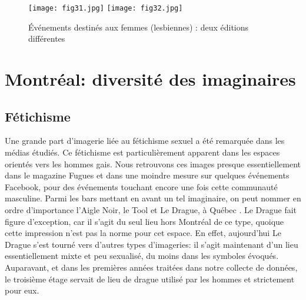 \begin{figure}
\centering
{}
{\texttt{[image: fig31.jpg]}}
{\texttt{[image: fig32.jpg]}}
\caption{Événements destinés aux femmes (lesbiennes) : deux éditions
  différentes}\label{figs3132}
\end{figure}

\section{Montréal: diversité des imaginaires}
\label{sec:montr_al_diversit_des_imaginaires}

\subsection{Fétichisme}
Une grande part d'imagerie liée au fétichisme sexuel a été remarquée dans les médias étudiés. 
Ce fétichisme est particulièrement apparent dans les espaces orientés vers les hommes gais. 
Nous retrouvons ces images presque essentiellement dans le magazine Fugues et dans une moindre mesure sur quelques événements Facebook, pour des événements touchant encore une fois cette communauté masculine. 
Parmi les bars mettant en avant un tel imaginaire, on peut nommer en ordre d'importance l'Aigle Noir, le Tool et Le Drague, à Québec . 
Le Drague fait figure d'exception, car il s'agit du seul lieu hors Montréal de ce type, quoique cette impression n'est pas la norme pour cet espace. 
En effet, aujourd'hui Le Drague s'est tourné vers d'autres types d'imageries: il s'agit maintenant d'un lieu essentiellement mixte et peu sexualisé, du moins dans les symboles évoqués. 
Auparavant, et dans les premières années traitées dans notre collecte de données, le troisième étage servait de lieu de drague utilisé par les hommes et strictement pour eux.

